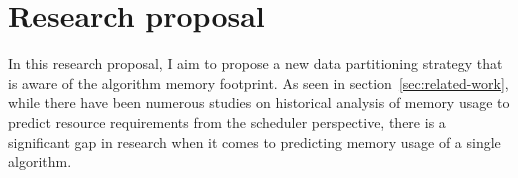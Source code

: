 \section{Research proposal}
\label{sec:research-proposal}

In this research proposal, I aim to propose a new data partitioning strategy that is aware of the algorithm memory footprint.
As seen in section~\ref{sec:related-work}, while there have been numerous studies on historical analysis of memory usage to predict resource requirements from the scheduler perspective, there is a significant gap in research when it comes to predicting memory usage of a single algorithm.







